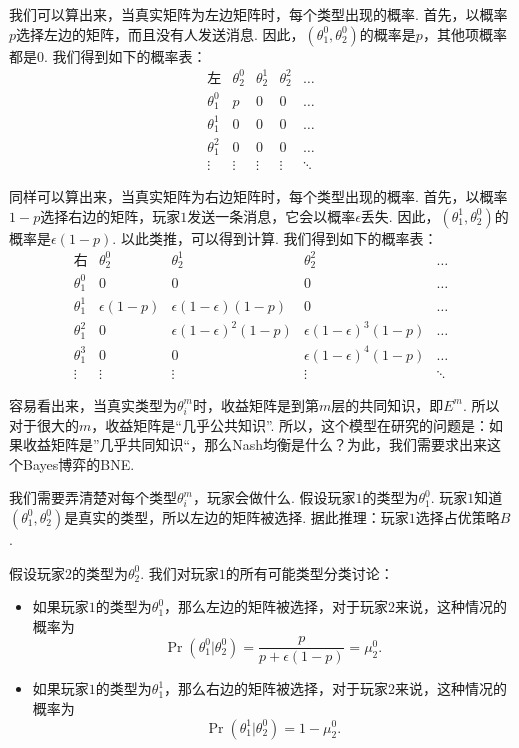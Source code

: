 我们可以算出来，当真实矩阵为左边矩阵时，每个类型出现的概率. 首先，以概率$p$选择左边的矩阵，而且没有人发送消息. 因此，$(\theta_1^0,\theta_2^0)$的概率是$p$，其他项概率都是$0$. 我们得到如下的概率表：
\[\begin{array}{c|cccc}
\text{左}& \theta_2^0 & \theta_2^1 & \theta_2^2 & \dots \\
\hline
\theta_1^0 & p & 0 & 0 & \dots \\
\theta_1^1 & 0 & 0 & 0 & \dots \\
\theta_1^2 & 0 & 0 & 0 & \dots \\
\vdots & \vdots & \vdots & \vdots & \ddots
\end{array}
\]

同样可以算出来，当真实矩阵为右边矩阵时，每个类型出现的概率. 首先，以概率$1 - p$选择右边的矩阵，玩家$1$发送一条消息，它会以概率$\epsilon$丢失. 因此，$(\theta_1^1,\theta_2^0)$的概率是$\epsilon(1 - p)$. 以此类推，可以得到计算. 我们得到如下的概率表：
\[
\begin{array}{c|cccc}
\text{右} & \theta_2^0 & \theta_2^1 & \theta_2^2 & \dots \\
\hline
\theta_1^0 & 0 & 0 & 0 & \dots \\
\theta_1^1 & \epsilon(1 - p) & \epsilon(1 - \epsilon)(1 - p) & 0 & \dots \\
\theta_1^2 & 0 & \epsilon(1 - \epsilon)^2(1 - p) & \epsilon(1 - \epsilon)^3(1 - p) & \dots \\
\theta_1^3 & 0 & 0 & \epsilon(1 - \epsilon)^4(1 - p) & \dots \\
\vdots & \vdots & \vdots & \vdots & \ddots
\end{array}
\]


容易看出来，当真实类型为$\theta_i^m$时，收益矩阵是到第$m$层的共同知识，即$E^m$. 所以对于很大的$m$，收益矩阵是“几乎公共知识”. 所以，这个模型在研究的问题是：如果收益矩阵是”几乎共同知识“，那么Nash均衡是什么？为此，我们需要求出来这个Bayes博弈的BNE.

我们需要弄清楚对每个类型$\theta_i^m$，玩家会做什么. 假设玩家$1$的类型为$\theta_1^0$. 玩家$1$知道$(\theta_1^0,\theta_2^0)$是真实的类型，所以左边的矩阵被选择. 据此推理：玩家$1$选择占优策略$B$.

假设玩家$2$的类型为$\theta_2^0$. 我们对玩家$1$的所有可能类型分类讨论：
\begin{itemize}
    \item 如果玩家$1$的类型为$\theta_1^0$，那么左边的矩阵被选择，对于玩家$2$来说，这种情况的概率为
    \[\Pr(\theta_1^0|\theta_2^0) = \frac{p}{p+\epsilon(1-p)} = \mu_2^0.\] 
    \item 如果玩家$1$的类型为$\theta_1^1$，那么右边的矩阵被选择，对于玩家$2$来说，这种情况的概率为
    \[\Pr(\theta_1^1|\theta_2^0) = 1 - \mu_2^0.\]
\end{itemize}

